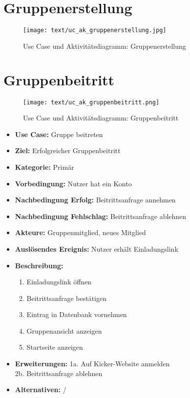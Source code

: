 \section{Gruppenerstellung}
\begin{figure}[h!]
	\centering
	\texttt{[image: text/uc\_ak\_gruppenerstellung.jpg]}
	\caption{Use Case und Aktivitätsdiagramm: Gruppenerstellung}
	\label{uc_ac_gruppenerstellung}
\end{figure}

\section{Gruppenbeitritt}
\begin{figure}[h!]
	\centering
	\texttt{[image: text/uc\_ak\_gruppenbeitritt.png]}
	\caption{Use Case und Aktivitätsdiagramm: Gruppenbeitritt}
	\label{uc_ac_gruppenbeitritt}
\end{figure}
\begin{itemize}
	\item \textbf{Use Case:} Gruppe beitreten
	\item \textbf{Ziel:} Erfolgreicher Gruppenbeitritt
	\item \textbf{Kategorie:} Primär
	\item \textbf{Vorbedingung:} Nutzer hat ein Konto
	\item \textbf{Nachbedingung Erfolg:} Beitrittsanfrage annehmen
	\item \textbf{Nachbedingung Fehlschlag:} Beitrittsanfrage ablehnen
	\item \textbf{Akteure:} Gruppenmitglied, neues Mitglied
	\item \textbf{Auslösendes Ereignis:} Nutzer erhält Einladungslink
	\item \textbf{Beschreibung:} \begin{enumerate}
		\item Einladungslink öffnen
		\item Beitrittsanfrage bestätigen
		\item Eintrag in Datenbank vornehmen
		\item Gruppenansicht anzeigen
		\item Startseite anzeigen
	\end{enumerate}
	\item \textbf{Erweiterungen:} 1a. Auf Kicker-Website anmelden\\
	2b. Beitrittsanfrage ablehnen
	\item \textbf{Alternativen:} /
\end{itemize}



